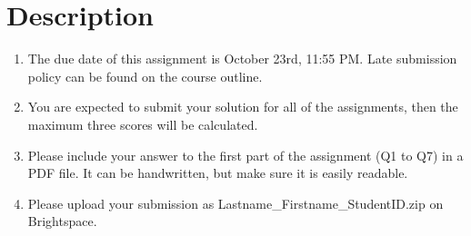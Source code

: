 \documentclass{homework}
\begin{document}
\section*{Description}
\begin{enumerate}
    \item The due date of this assignment is October 23rd, 11:55 PM. Late submission policy can be found on the course outline.
    \item You are expected to submit your solution for all of the assignments, then the maximum three scores will be calculated.
    \item Please include your answer to the first part of the assignment (Q1 to Q7) in a PDF file. It can be handwritten, but make sure it is easily readable.
    \item Please upload your submission as Lastname\_Firstname\_StudentID.zip on Brightspace.
\end{enumerate}
\end{document}
